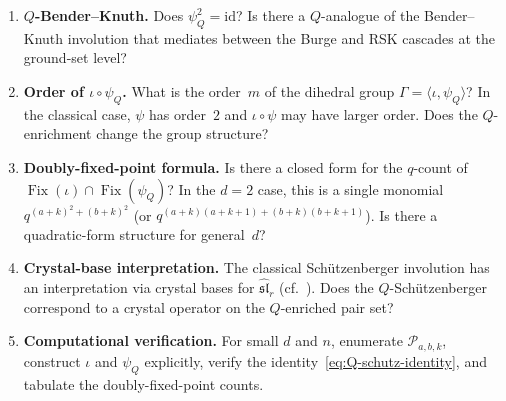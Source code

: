 \documentclass[11pt]{article}
\DeclareMathOperator{\Fix}{Fix}
\theoremstyle{plain}
\theoremstyle{definition}
\begin{document}
\begin{enumerate}
  \item \textbf{$Q$-Bender--Knuth.}\;
    Does $\psi_Q^2 = \mathrm{id}$?  Is there a
    $Q$-analogue of the Bender--Knuth involution that
    mediates between the Burge and RSK cascades at the
    ground-set level?

  \item \textbf{Order of $\iota \circ \psi_Q$.}\;
    What is the order~$m$ of the dihedral group
    $\Gamma = \langle \iota, \psi_Q \rangle$?  In the
    classical case, $\psi$ has order~$2$ and
    $\iota \circ \psi$ may have larger order.  Does the
    $Q$-enrichment change the group structure?

  \item \textbf{Doubly-fixed-point formula.}\;
    Is there a closed form for the $q$-count of
    $\Fix(\iota) \cap \Fix(\psi_Q)$?  In the $d = 2$ case,
    this is a single monomial $q^{(a+k)^2 + (b+k)^2}$
    (or $q^{(a+k)(a+k+1) + (b+k)(b+k+1)}$).  Is there a
    quadratic-form structure for general~$d$?

  \item \textbf{Crystal-base interpretation.}\;
    The classical Sch\"utzenberger involution has an
    interpretation via crystal bases for
    $\widehat{\mathfrak{sl}}_r$
    (cf.~\cite{COMMUTATION}).  Does the
    $Q$-Sch\"utzenberger correspond to a crystal operator
    on the $Q$-enriched pair set?

  \item \textbf{Computational verification.}\;
    For small $d$ and $n$, enumerate $\mathcal{P}_{a,b,k}$,
    construct $\iota$ and $\psi_Q$ explicitly, verify the
    identity~\eqref{eq:Q-schutz-identity}, and tabulate the
    doubly-fixed-point counts.
\end{enumerate}
\end{document}
